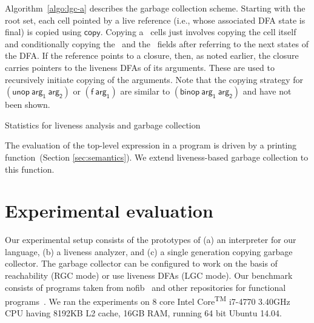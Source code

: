 \documentclass[9pt,nonatbib]{sigplanconf}
\begin{document}
Algorithm~\ref{algo:lgc-a}   describes   the   garbage
collection scheme.  Starting with the root set, each cell pointed by a
live reference  (i.e., whose associated  DFA state is final)  is copied
using $\mathsf{copy}$.   Copying a \CONS\ cells  just involves copying
the  cell  itself   and  conditionally  copying  the   \CAR\  and  the
\CDR\ fields after referring to the  next states of the DFA.  If
the reference points to a closure, then, as noted earlier, the closure
carries pointers  to the liveness  DFAs of its  arguments.  These
are  used to recursively  initiate copying of  the arguments.
Note that  the copying  strategy for  $\mathsf{(unop~arg_1~arg_2)}$ or
$\mathsf{(f~arg_1)}$ are similar to $\mathsf{(binop~arg_1~arg_2)}$ and
have not been shown.



\begin{table*}[t!]
\caption{Statistics for liveness analysis and garbage collection}
\label{tab:exp-results}
\vskip -2mm
\centering

\vskip -5mm

\vskip -7mm
\end{table*} 

The evaluation of  the top-level expression in a program  is driven by
a printing function~(Section
\ref{sec:semantics}).  
We extend liveness-based  garbage  collection  to
this function.
\section{Experimental evaluation}
\label{sec:experiments}
Our  experimental  setup   consists  of  the  prototypes   of  (a)  an
interpreter  for our  language, (b)  a  liveness analyzer,  and (c)  a
single generation  copying garbage  collector.  The  garbage collector
can be configured  to work on the basis of  reachability (RGC mode) or
use liveness DFAs (LGC mode).
%
Our benchmark consists of programs taken from nofib~\cite{nofib} and
other repositories for functional programs~\cite{PLT-Scheme, gc_bench,
  huffman-sicp}.  We ran the experiments on 8 core
Intel\textsuperscript{\textregistered} Core\textsuperscript{TM}
i7-4770 3.40GHz CPU having 8192KB L2 cache, 16GB RAM, running 64 bit
Ubuntu 14.04.
\end{document}
